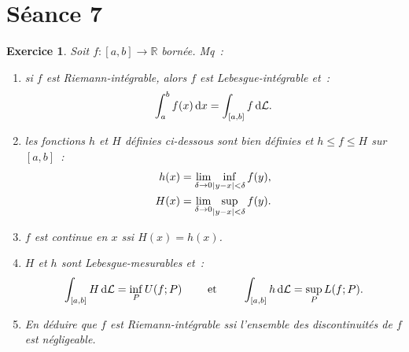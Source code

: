 \documentclass{article}
\newtheorem{ex}{Exercice}[section]
\newcommand{\R}{{\mathbb R}}
\begin{document}
\newpage
\section{Séance 7}
\begin{ex}\label{ex:7.1}
Soit $f : [a, b] \to \R$ bornée. Mq~:
\begin{enumerate}
	\item si $f$ est Riemann-intégrable, alors $f$ est Lebesgue-intégrable et~:
	\[\int_a^bf(x)\dif x = \int_{[a, b]}f\dif\mathcal L.\]
	\item les fonctions $h$ et $H$ définies ci-dessous sont bien définies et $h \leq f \leq H$ sur $[a, b]$~:
	\begin{align*}
		h(x) &= \lim_{\delta \to 0}\inf_{\abs {y-x}<\delta}f(y), \\
		H(x) &= \lim_{\delta \to 0}\sup_{\abs {y-x}<\delta}f(y).
	\end{align*}
	\item $f$ est continue en $x$ ssi $H(x) = h(x)$.
	\item $H$ et $h$ sont Lebesgue-mesurables et~:
	\[\int_{[a, b]}H\dif\mathcal L = \inf_PU(f; P) \qquad \text{ et } \qquad \int_{[a, b]}h\dif\mathcal L = \sup_PL(f; P).\]
	\item En déduire que $f$ est Riemann-intégrable ssi l'ensemble des discontinuités de $f$ est négligeable.
\end{enumerate}
\end{ex}
\end{document}

